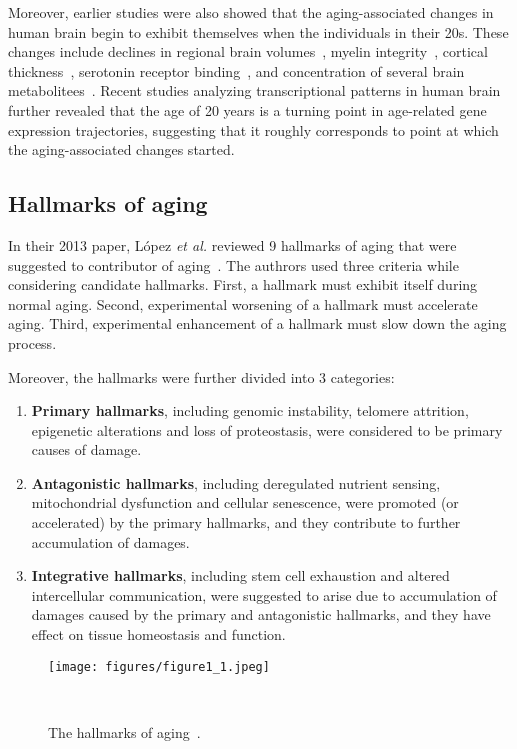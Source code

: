 Moreover, earlier studies were also showed that the aging-associated changes in human brain begin to exhibit themselves when the individuals in their 20s.
These changes include declines in regional brain volumes~\cite{Sowell2003}, myelin integrity~\cite{Sullivan2006}, cortical thickness~\cite{Salat2004, Magnotta1999},
serotonin receptor binding~\cite{Sheline2002}, and concentration of several brain metabolitees~\cite{Salthouse2009, Kadota2001}.
Recent studies analyzing transcriptional patterns in human brain further revealed that the age of 20 years is a turning point in age-related gene expression trajectories,
suggesting that it roughly corresponds to point at which the aging-associated changes started.

\subsection{Hallmarks of aging}
In their 2013 paper, López \textit{et al.} reviewed 9 hallmarks of aging that were suggested to contributor of aging~\cite{Lopez2013}.
The authrors used three criteria while considering candidate hallmarks. 
First, a hallmark must exhibit itself during normal aging.
Second, experimental worsening of a hallmark must accelerate aging.
Third, experimental enhancement of a hallmark must slow down the aging process. 

Moreover, the hallmarks were further divided into 3 categories:
\begin{enumerate}
    \item \textbf{Primary hallmarks}, including genomic instability, telomere attrition, epigenetic alterations and loss of proteostasis,
    were considered to be primary causes of damage.
    \item \textbf{Antagonistic hallmarks}, including deregulated nutrient sensing, mitochondrial dysfunction and cellular senescence,
    were promoted (or accelerated) by the primary hallmarks, and they contribute to further accumulation of damages.
    \item \textbf{Integrative hallmarks}, including stem cell exhaustion and altered intercellular communication, 
    were suggested to arise due to accumulation of damages caused by the primary and antagonistic hallmarks,
    and they have effect on tissue homeostasis and function.
\end{enumerate}

\begin{figure}[h]
    \centering
    \texttt{[image: figures/figure1\_1.jpeg]}
    \caption{The hallmarks of aging~\cite{Lopez2013}.
    }~\label{fig:fig1.1}
\end{figure}


